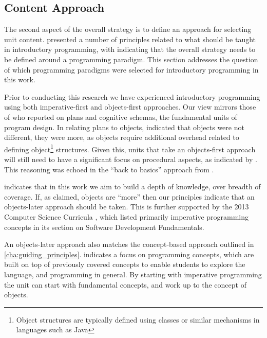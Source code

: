 
\subsection{Content Approach} %
\label{sub:content_approach}

The second aspect of the overall strategy is to define an approach for selecting unit content.  presented a number of principles related to what should be taught in introductory programming, with  indicating that the overall strategy needs to be defined around a programming paradigm. This section addresses the question of which programming paradigms were selected for introductory programming in this work.

Prior to conducting this research we have experienced introductory programming using both imperative-first and objects-first approaches. Our view mirrors those of \citet{Rist:1996} who reported on plans and cognitive schemas, the fundamental units of program design. In relating plans to objects, \citet{Rist:1996} indicated that objects were not different, they were more, as objects require additional overhead related to defining object\footnote{Object structures are typically defined using classes or similar mechanisms in languages such as Java} structures. Given this, units that take an objects-first approach will still need to have a significant focus on procedural aspects, as indicated by \citet{Robins:2003}. This reasoning was echoed in the ``back to basics'' approach from \citet{Reges:2006}.

 indicates that in this work we aim to build a depth of knowledge, over breadth of coverage. If, as \citet{Rist:1996} claimed, objects are ``more'' then our principles indicate that an objects-later approach should be taken. This is further supported by the 2013 Computer Science Curricula \cite{CSC2013}, which listed primarily imperative programming concepts in its section on Software Development Fundamentals.

An objects-later approach also matches the concept-based approach outlined in \cref{cha:guiding_principles}.  indicates a focus on programming concepts, which are built on top of previously covered concepts to enable students to explore the language, and programming in general. By starting with imperative programming the unit can start with fundamental concepts, and work up to the concept of objects.

